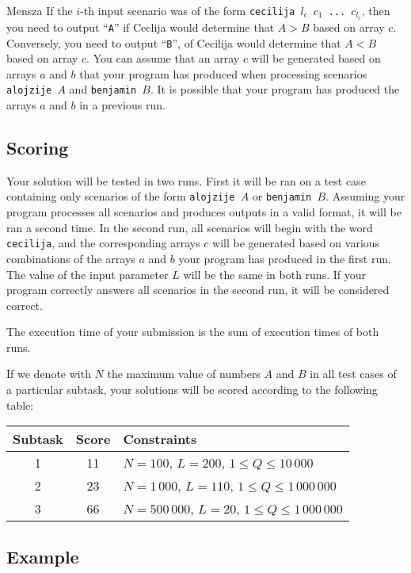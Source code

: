 \begin{statement}[
  problempoints=100,
  timelimit=5 seconds,
  memorylimit=512 MiB,
]{Mensza}
If the $i$-th input scenario was of the form \texttt{cecilija $l_c$ $c_1$ ...
$c_{l_c}$}, then you need to output ``\texttt{A}'' if Ceclija would determine
that $A > B$ based on array $c$. Conversely, you need to output ``\texttt{B}'',
of Cecilija would determine that $A < B$ based on array $c$. You can assume that
an array $c$ will be generated based on arrays $a$ and $b$ that your program has
produced when processing scenarios \texttt{alojzije $A$} and \texttt{benjamin $B$}.
It is possible that your program has produced the arrays $a$ and $b$ in a previous
run.

\subsection*{Scoring}
Your solution will be tested in two runs. First it will be ran on a test case
containing only scenarios of the form  \texttt{alojzije $A$} or
\texttt{benjamin $B$}. Assuming your program processes all scenarios and produces
outputs in a valid format, it will be ran a second time. In the second run, all
scenarios will begin with the word \texttt{cecilija}, and the corresponding
arrays $c$ will be generated based on various combinations of the arrays $a$
and $b$ your program has produced in the first run. The value of the input parameter
$L$ will be the same in both runs. If your program correctly answers all scenarios
in the second run, it will be considered correct.

The execution time of your submission is the sum of execution times of both runs.

If we denote with $N$ the maximum value of numbers $A$ and $B$ in all test cases
of a particular subtask, your solutions will be scored according to the following
table:

{\renewcommand{\arraystretch}{1.4}
  \setlength{\tabcolsep}{6pt}
  \begin{tabular}{ccl}
   Subtask & Score & Constraints \\ \midrule
    1 & 11 & $N = 100$, $L = 200$, $1 \le Q \le 10\,000$ \\
    2 & 23 & $N = 1\,000$, $L = 110$, $1 \le Q \le 1\,000\,000$ \\
    3 & 66 & $N = 500\,000$, $L = 20$, $1 \le Q \le 1\,000\,000$
\end{tabular}}

\subsection*{Example}

\end{statement}

